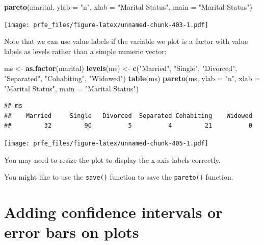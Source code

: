 \documentclass[12pt,a4paper]{book}
\newenvironment{Shaded}{\begin{snugshade}}{\end{snugshade}}
\newcommand{\DataTypeTok}[1]{\textcolor[rgb]{0.13,0.29,0.53}{#1}}
\newcommand{\KeywordTok}[1]{\textcolor[rgb]{0.13,0.29,0.53}{\textbf{#1}}}
\newcommand{\NormalTok}[1]{#1}
\newcommand{\StringTok}[1]{\textcolor[rgb]{0.31,0.60,0.02}{#1}}
\theoremstyle{definition}
\theoremstyle{definition}
\theoremstyle{definition}
\theoremstyle{remark}
\begin{document}
\begin{Shaded}
\begin{Highlighting}[]
\KeywordTok{pareto}\NormalTok{(marital, }\DataTypeTok{ylab =} \StringTok{"n"}\NormalTok{, }\DataTypeTok{xlab =} \StringTok{"Marital Status"}\NormalTok{,}
       \DataTypeTok{main =} \StringTok{"Marital Status"}\NormalTok{)}
\end{Highlighting}
\end{Shaded}

\texttt{[image: prfe\_files/figure-latex/unnamed-chunk-403-1.pdf]}

Note that we can use value labels if the variable we plot is a factor
with value labels as levels rather than a simple numeric vector:

\begin{Shaded}
\begin{Highlighting}[]
\NormalTok{ms <-}\StringTok{ }\KeywordTok{as.factor}\NormalTok{(marital)}
\KeywordTok{levels}\NormalTok{(ms) <-}\StringTok{ }\KeywordTok{c}\NormalTok{(}\StringTok{"Married"}\NormalTok{, }\StringTok{"Single"}\NormalTok{, }\StringTok{"Divorced"}\NormalTok{, }\StringTok{"Separated"}\NormalTok{,}
                \StringTok{"Cohabiting"}\NormalTok{, }\StringTok{"Widowed"}\NormalTok{)}
\KeywordTok{table}\NormalTok{(ms)}
\KeywordTok{pareto}\NormalTok{(ms, }\DataTypeTok{ylab =} \StringTok{"n"}\NormalTok{, }\DataTypeTok{xlab =} \StringTok{"Marital Status"}\NormalTok{,}
       \DataTypeTok{main =} \StringTok{"Marital Status"}\NormalTok{)}
\end{Highlighting}
\end{Shaded}

\begin{verbatim}
## ms
##    Married     Single   Divorced  Separated Cohabiting    Widowed 
##         32         90          5          4         21          0
\end{verbatim}

\texttt{[image: prfe\_files/figure-latex/unnamed-chunk-405-1.pdf]}

You may need to resize the plot to display the x-axis labels correctly.

You might like to use the \texttt{save()} function to save the
\texttt{pareto()} function.

\hypertarget{adding-confidence-intervals-or-error-bars-on-plots}{%
\section{Adding confidence intervals or error bars on
plots}\label{adding-confidence-intervals-or-error-bars-on-plots}}
\end{document}
